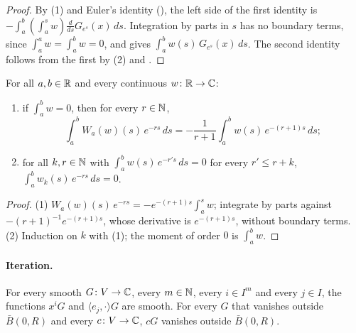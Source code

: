 \begin{proof}
\leanok
By  (1) and Euler's identity
(), the left side of the first identity is
$-\int_a^b (\int_a^s w) \frac{d}{ds} G_{e^s}(x) \, ds$. Integration by parts in $s$ has no
boundary terms, since $\int_a^a w = \int_a^b w = 0$, and gives
$\int_a^b w(s) \, G_{e^s}(x) \, ds$. The second identity follows from the first by
 (2) and .
\end{proof}

\begin{lemma}
\label{lem:anti-weight-moments}
\leanok
{}
For all $a, b \in \mathbb{R}$ and every continuous $w \colon \mathbb{R} \to \mathbb{C}$:
\begin{enumerate}
  \item if $\int_a^b w = 0$, then for every $r \in \mathbb{N}$,
    \[
      \int_a^b W_a(w)(s) \, e^{-rs} \, ds = -\frac{1}{r + 1} \int_a^b w(s) \, e^{-(r+1)s} \, ds ;
    \]
  \item for all $k, r \in \mathbb{N}$ with $\int_a^b w(s) \, e^{-r's} \, ds = 0$ for every $r' \leq r + k$,
    $\int_a^b w_k(s) \, e^{-rs} \, ds = 0$.
\end{enumerate}
\end{lemma}

\begin{proof}
\leanok
(1) $W_a(w)(s) \, e^{-rs} = -e^{-(r+1)s} \int_a^s w$; integrate by parts against
$-(r+1)^{-1} e^{-(r+1)s}$, whose derivative is $e^{-(r+1)s}$, without boundary terms.
(2) Induction on $k$ with (1); the moment of order $0$ is $\int_a^b w$.
\end{proof}

\paragraph{Iteration.}

\begin{lemma}
\label{lem:monomial-kernels}
\leanok
For every smooth $G \colon V \to \mathbb{C}$, every $m \in \mathbb{N}$, every $i \in I^m$ and every $j \in I$, the
functions $x^i G$ and $\langle e_j, \cdot \rangle G$ are smooth. For every $G$ that vanishes
outside $\bar B(0, R)$ and every $c \colon V \to \mathbb{C}$, $c G$ vanishes outside $\bar B(0, R)$.
\end{lemma}

